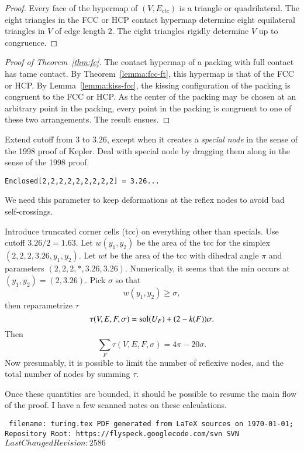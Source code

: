 \documentclass{llncs}
\def\svninfo{{\tt
  filename: turing.tex\hfill\break
  PDF generated from LaTeX sources on \today; \hfill\break
  Repository Root: https://flyspeck.googlecode.com/svn \hfill\break
  SVN $LastChangedRevision: 2586 $
  }
  }
\begin{document}
\begin{proof} Every face of the hypermap of $(V,E_{ctc})$ is a
  triangle or quadrilateral.  The eight triangles in the FCC or HCP
  contact hypermap determine eight equilateral triangles in $V$ of
  edge length $2$.  The eight triangles rigidly determine $V$ up to
  congruence.
\end{proof}

\begin{proof}[Proof of Theorem~\ref{thm:fc}]  %
  The contact hypermap of a packing with full contact has tame
  contact.  By Theorem~\ref{lemma:fcc-ft}, this hypermap is that of
  the FCC or HCP.  By Lemma~\ref{lemma:kiss-fcc}, the kissing
  configuration of the packing is congruent to the FCC or HCP.  As the
  center of the packing may be chosen at an arbitrary point in the
  packing, every point in the packing is congruent to one of these two
  arrangements.  The result ensues.
\end{proof}




Extend cutoff from $3$ to $3.26$, except when it creates a
{\it special node} in the sense of the 1998 proof of Kepler.
Deal with special node by dragging them along in the sense of the 1998 proof.


\begin{verbatim}
Enclosed[2,2,2,2,2,2,2,2,2] = 3.26...
\end{verbatim}
We need this parameter to keep deformations at the reflex nodes to avoid
bad self-crossings.

Introduce truncated corner cells (tcc) on everything other than specials.
Use cutoff $3.26/2 = 1.63$.  Let $w(y_1,y_2)$ be the area of the tcc
for the simplex $(2,2,2,3.26,y_1,y_2)$.  Let $wt$ be the area of the tcc
with dihedral angle $\pi$ and parameters $(2,2,2,*,3.26,3.26)$.
Numerically, it seems that the min
occurs at $(y_1,y_2)=(2,3.26)$.  Pick $\sigma$ so that 
\[
w(y_1,y_2)\ge \sigma,
\]
then 
reparametrize $\tau$ 
\[
\tau(V,E,F,\sigma) = \operatorname{sol}(U_F) + (2-k(F)) \sigma.
\]
Then
\[
\sum_F\tau(V,E,F,\sigma) = 4\pi - 20\sigma.
\]
Now presumably, it is possible to limit the number of reflexive nodes,
and the total number of nodes by summing $\tau$.

Once these quantities are bounded, it should be possible to resume the
main flow of the proof.  I have a few scanned notes on these calculations.




\raggedright



\newpage
\bigskip
\noindent
\svninfo
\smallskip

\noindent
\endnote
\end{document}
